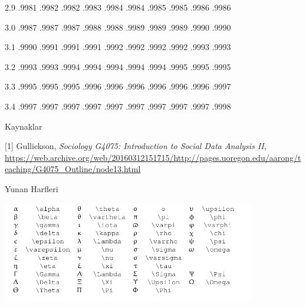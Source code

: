 \documentclass[12pt,fleqn]{article}\usepackage{../../common}
\begin{document}
2.9 .9981 .9982 .9982 .9983 .9984 .9984 .9985 .9985 .9986 .9986

3.0 .9987 .9987 .9987 .9988 .9988 .9989 .9989 .9989 .9990 .9990

3.1 .9990 .9991 .9991 .9991 .9992 .9992 .9992 .9992 .9993 .9993

3.2 .9993 .9993 .9994 .9994 .9994 .9994 .9994 .9995 .9995 .9995

3.3 .9995 .9995 .9995 .9996 .9996 .9996 .9996 .9996 .9996 .9997

3.4 .9997 .9997 .9997 .9997 .9997 .9997 .9997 .9997 .9997 .9998

Kaynaklar

[1] Gullickson, {\em Sociology G4075: Introduction to Social Data Analysis
  II}, \url{https://web.archive.org/web/20160312151715/http://pages.uoregon.edu/aarong/teaching/G4075_Outline/node13.html}


\newpage

Yunan Harfleri

\includegraphics[width=30em]{../../algs/algs_999_zapp/letters.png}
\end{document}
